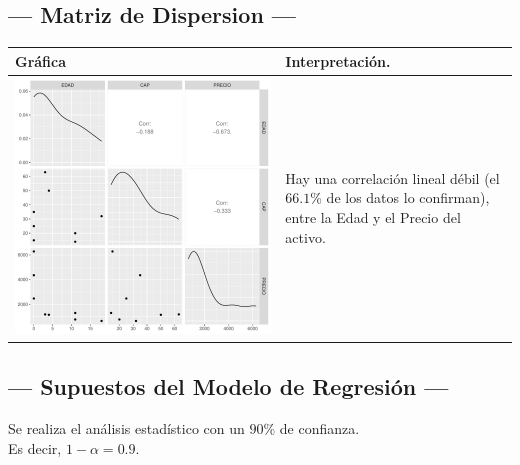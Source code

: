 \subsection{\centering --- Matriz de Dispersion ---} %
\begin{center}
  \begin{tabular}{|p{11cm}|p{5cm}|}
    \hline
    Gráfica & Interpretación. \\ \hline 
    \begin{minipage}{\textwidth}
    \includegraphics[width= 0.5 \linewidth, page=1]{../0.documentos/3_MERGED_MARKET/5_SECADOR_AIRE/r/Rplots.pdf}
    \end{minipage} 
    &
		Hay una correlación lineal débil (el \(66.1\%\) de los datos lo confirman),
		entre la Edad y el Precio del activo.
		\\ \hline 
  \end{tabular}
\end{center} 

\subsection{\centering --- Supuestos del Modelo de Regresión ---} %

Se realiza el análisis estadístico con un \(90\%\) de confianza. \\ 
Es decir, \(1- \alpha = 0.9\).

